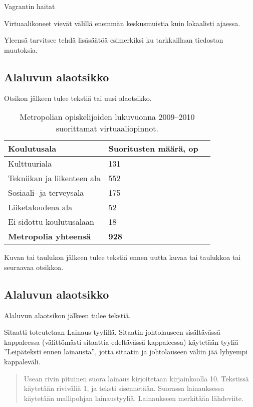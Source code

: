 Vagrantin haitat
\begin{bullet-list}
  \item Virtuaalikoneet vievät välillä enemmän keskusmuistia kuin lokaalisti ajaessa.
  \item Yleensä tarvitsee tehdä lisäsäätöä esimerkiksi ku tarkkaillaan tiedoston muutoksia.
\end{bullet-list}

\subsection{Alaluvun alaotsikko}

Otsikon jälkeen tulee tekstiä tai uusi alaotsikko.

\begin{table}[h]
  \caption{Metropolian opiskelijoiden lukuvuonna 2009–2010 suorittamat virtuaaliopinnot.}
  \begin{tabular}{| l | l | l |}
  \hline
  \bfseries Koulutusala & \bfseries Suoritusten määrä, op \\
  \hline
  Kulttuuriala & 131 \\
  \hline
  Tekniikan ja liikenteen ala & 552 \\
  \hline
  Sosiaali- ja terveysala & 175 \\
  \hline
  Liiketaloudena ala & 52 \\
  \hline
  Ei sidottu koulutusalaan & 18 \\
  \hline
  \bfseries Metropolia yhteensä & \bfseries 928 \\
  \hline
  \end{tabular}
  \label{tab:virtual studies}
\end{table}

Kuvan tai taulukon jälkeen tulee tekstiä ennen uutta kuvaa tai taulukkoa tai seuraavaa otsikkoa.

\subsection{Alaluvun alaotsikko}

Alaluvun alaotsikon jälkeen tulee tekstiä.

Sitaatti toteutetaan Lainaus-tyylillä. Sitaatin johtolauseen sisältävässä kappaleessa (välittömästi sitaattia edeltävässä kappaleessa) käytetään tyyliä ”Leipäteksti ennen lainausta”, jotta sitaatin ja johtolauseen väliin jää lyhyempi kappaleväli.

\begin{quote}
Usean rivin pituinen suora lainaus kirjoitetaan kirjainkoolla 10. Tekstissä käytetään riviväliä 1, ja teksti sisennetään. Suorassa lainauksessa käytetään mallipohjan lainaustyyliä. Lainaukseen merkitään lähdeviite.
\end{quote}